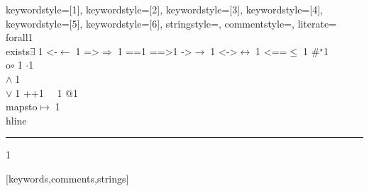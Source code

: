 {%
    keywordstyle=[1]{\ttfamily},
    keywordstyle=[2]{\ttfamily},
    keywordstyle=[3]{\ttfamily},
    keywordstyle=[4]{\ttfamily},
    keywordstyle=[5]{\ttfamily},
    keywordstyle=[6]{\ttfamily},
    stringstyle=\ttfamily,
    commentstyle={\ttfamily},
    literate=
        {\\forall}{{\color{dkgreen}{$\forall\;$}}}1
        {\\exists}{{$\exists\;$}}1
        {<-}{{$\leftarrow\;$}}1
        {=>}{{$\Rightarrow\;$}}1
        {==}{{\code{==}\;}}1
        {==>}{{\code{==>}\;}}1
        {->}{{$\rightarrow\;$}}1
        {<->}{{$\leftrightarrow\;$}}1
        {<==}{{$\leq\;$}}1
        {\#}{{$^\star$}}1
        {\\o}{{$\circ\;$}}1
        {\@}{{$\cdot$}}1
        {\/\\}{{$\wedge\;$}}1
        {\\\/}{{$\vee\;$}}1
        {++}{{\code{++}}}1
        {~}{{\ }}1
        {\@\@}{{$@$}}1
        {\\mapsto}{{$\mapsto\;$}}1
        {\\hline}{{\rule{\linewidth}{0.5pt}}}1
%
}[keywords,comments,strings]